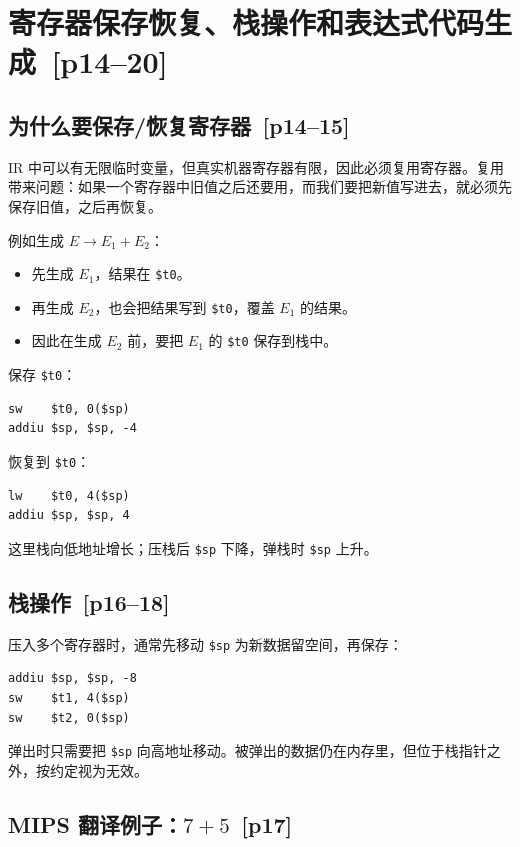 \documentclass[UTF8,fontset=none,11pt]{ctexart}
\newcommand{\pg}[1]{\texorpdfstring{{\small\color{graytext}\,[p#1]}}{ [p#1]}}
\begin{document}
\section{寄存器保存恢复、栈操作和表达式代码生成 \pg{14--20}}

\subsection{为什么要保存/恢复寄存器 \pg{14--15}}

IR 中可以有无限临时变量，但真实机器寄存器有限，因此必须复用寄存器。复用带来问题：如果一个寄存器中旧值之后还要用，而我们要把新值写进去，就必须先保存旧值，之后再恢复。

例如生成 \(E\to E_1+E_2\)：

\begin{itemize}
  \item 先生成 \(E_1\)，结果在 \texttt{\$t0}。
  \item 再生成 \(E_2\)，也会把结果写到 \texttt{\$t0}，覆盖 \(E_1\) 的结果。
  \item 因此在生成 \(E_2\) 前，要把 \(E_1\) 的 \texttt{\$t0} 保存到栈中。
\end{itemize}

保存 \texttt{\$t0}：
\begin{verbatim}
sw    $t0, 0($sp)
addiu $sp, $sp, -4
\end{verbatim}

恢复到 \texttt{\$t0}：
\begin{verbatim}
lw    $t0, 4($sp)
addiu $sp, $sp, 4
\end{verbatim}

这里栈向低地址增长；压栈后 \texttt{\$sp} 下降，弹栈时 \texttt{\$sp} 上升。

\subsection{栈操作 \pg{16--18}}

压入多个寄存器时，通常先移动 \texttt{\$sp} 为新数据留空间，再保存：

\begin{verbatim}
addiu $sp, $sp, -8
sw    $t1, 4($sp)
sw    $t2, 0($sp)
\end{verbatim}

弹出时只需要把 \texttt{\$sp} 向高地址移动。被弹出的数据仍在内存里，但位于栈指针之外，按约定视为无效。

\subsection{MIPS 翻译例子：\texorpdfstring{\(7+5\)}{7+5} \pg{17}}
\end{document}
